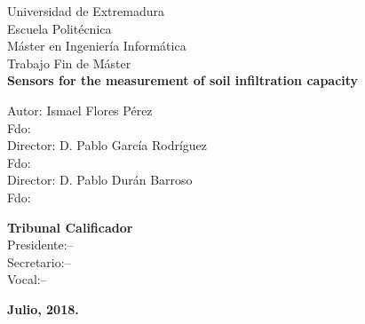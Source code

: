 \begin{center}
{\huge Universidad de Extremadura}\\[0.5cm]
{\LARGE Escuela Politécnica}\\[0.5cm]
{\Large Máster en Ingeniería Informática}\\[0.5cm]
{\Large Trabajo Fin de Máster}\\[0.3cm]
{\Large \textbf{Sensors for the measurement of soil infiltration capacity}}\\[0.5cm]
\end{center}


\begin{center}
{\normalsize Autor: Ismael Flores Pérez}\\[0.05cm]
{\normalsize Fdo:}\\[0.10cm]
{\normalsize Director: D. Pablo García Rodríguez}\\[0.05cm]
{\normalsize Fdo:}\\[0.10cm]
{\normalsize Director: D. Pablo Durán Barroso}\\[0.05cm]
{\normalsize Fdo:}\\[0.6cm]
\end{center}


\begin{flushleft}
{\normalsize \textbf{Tribunal Calificador}}\\[0.2cm]

{\normalsize Presidente:--}\\[0.2cm]
{\normalsize Secretario:--}\\[0.2cm]
{\normalsize Vocal:--}\\[0.2cm]
\end{flushleft}


\begin{center}
\vspace*{0.2cm}
\textbf{Julio, 2018.}
\end{center}



